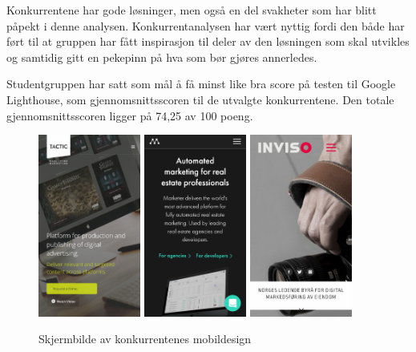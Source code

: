 Konkurrentene har gode løsninger, men også en del svakheter som har blitt påpekt i denne analysen. Konkurrentanalysen har vært nyttig fordi den både har ført til at gruppen har fått inspirasjon til deler av den løsningen som skal utvikles og samtidig gitt en pekepinn på hva som bør gjøres annerledes.

Studentgruppen har satt som mål å få minst like bra score på testen til Google Lighthouse, som gjennomsnittsscoren til de utvalgte konkurrentene. Den totale gjennomsnittsscoren ligger på 74,25 av 100 poeng.
\begin{figure}[H]
    \begin{center}
        \includegraphics[width=0.3\textwidth]{line/tacticrealtime_com_(iPhone_6_7_8).png}
        \includegraphics[width=0.3\textwidth]{line/marketer_tech_(iPhone_6_7_8).png}
        \includegraphics[width=0.3\textwidth]{line/inviso_no_(iPhone_6_7_8).png}
        \caption{Skjermbilde av konkurrentenes mobildesign}
        \label{fig:competitors-mobile}
    \end{center}
\end{figure}

